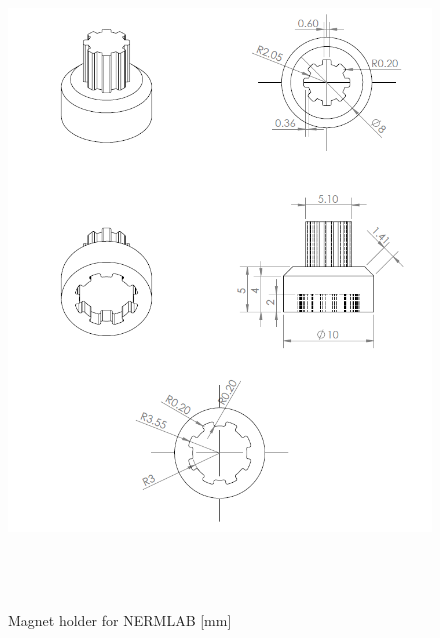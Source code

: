 \begin{figure}[htb]%
	\begin{center}
		\includegraphics[height=7in]{figures/drawings/magnet_holder_drawing.png}
		
		\caption[Magnet holder for NERMLAB]{Magnet holder for NERMLAB [mm]}
		
		\label{magnet_holder_drawing}
	\end{center}
\end{figure}

